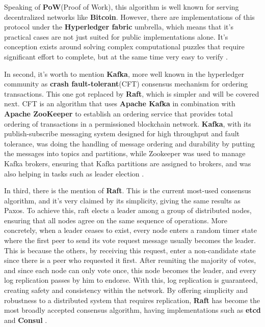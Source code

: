 Speaking of \textbf{PoW}(Proof of Work), this algorithm is well known for serving decentralized networks like \textbf{Bitcoin}. However, there are implementations of this protocol under the \textbf{Hyperledger fabric} umbrella, which means that it's practical cases are not just suited for public implementations alone. It's conception exists around solving complex computational puzzles that require significant effort to complete, but at the same time very easy to verify \cite{PoW} \cite{PoW-hyperledger} \cite{pow-hibrid-hyperledger}.

In second, it's worth to mention \textbf{Kafka}, more well known in the hyperledger community as \textbf{crash fault-tolerant}(CFT) consensus mechanism for ordering transactions. This one got replaced by \textbf{Raft}, which is simpler and will be covered next. CFT is an algorithm that uses \textbf{Apache Kafka} in combination with \textbf{Apache ZooKeeper} to establish an ordering service that provides total ordering of transactions in a permissioned blockchain network. \textbf{Kafka}, with its publish-subscribe messaging system designed for high throughput and fault tolerance, was doing the handling of message ordering and durability by putting the messages into topics and partitions, while Zookeeper was used to manage Kafka brokers, ensuring that Kafka partitions are assigned to brokers, and was also helping in tasks such as leader election \cite{kafka-consensus}.

In third, there is the mention of \textbf{Raft}. This is the current most-used consensus algorithm, and it's very claimed by its simplicity, giving the same results as Paxos. To achieve this, raft elects a leader among a group of distributed nodes, ensuring that all nodes agree on the same sequence of operations. More concretely, when a leader ceases to exist, every node enters a random timer state where the first peer to send its vote request message usually becomes the leader. This is because the others, by receiving this request, enter a non-candidate state since there is a peer who requested it first. After reuniting the majority of votes, and since each node can only vote once, this node becomes the leader, and every log replication passes by him to endorse. With this, log replication is guaranteed, creating safety and consistency within the network. By offering simplicity and robustness to a distributed system that requires replication, \textbf{Raft} has become the most broadly accepted consensus algorithm, having implementations such as \textbf{etcd} and \textbf{Consul} \cite{raft-consensus} \cite{etcd} \cite{consul}.

